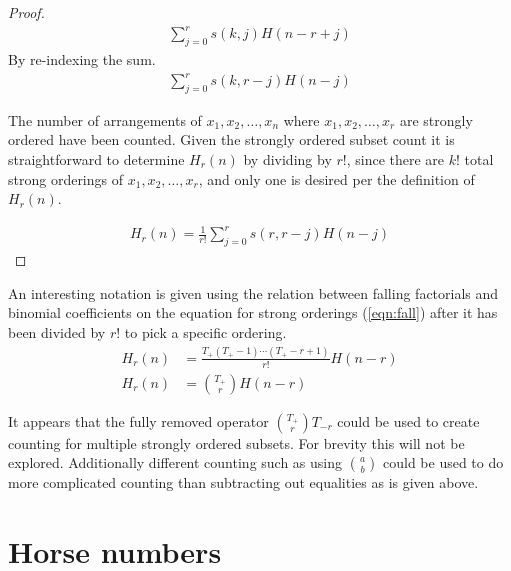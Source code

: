 \documentclass[12pt,reqno]{article}
\begin{document}
\begin{theorem}
\begin{proof}
\begin{align}
	\sum_{j = 0}^{r} s(k,j) H(n - r + j)
\end{align}
By re-indexing the sum.
\begin{align}
	\sum_{j = 0}^{r} s(k,r - j) H(n - j)
\end{align}

The number of arrangements of $x_{1}, x_{2}, \ldots, x_{n}$ where $x_{1}, x_{2}, \ldots, x_{r}$ are strongly ordered have been counted. Given the strongly ordered subset count it is straightforward  to determine $H_{r}(n)$ by dividing by $r!$, since there are $k!$ total strong orderings of $x_{1}, x_{2}, \ldots, x_{r}$, and only one is desired per the definition of $H_{r}(n)$.

\begin{align}
	H_{r} (n) = \frac{1}{r!}\sum_{j = 0}^{r} s(r,r - j) H(n - j) \nonumber
\end{align}



\end{proof}

\end{theorem}


An interesting notation is given using the relation between falling factorials and binomial coefficients on the equation for strong orderings (\ref{eqn:fall}) after it has been divided by $r!$ to pick a specific ordering.
\begin{align}
	H_{r} (n)  &= \frac{T_{+} (T_{+} - 1) \cdots (T_{+} - r + 1)}{r!} H(n - r)\\
	H_{r} (n)  &= \binom{T_{+}}{r} H(n - r) \label{eqn:binom}
\end{align}

It appears that the fully removed operator $\binom{T_{+}}{r} T_{-r}$ could be used to create counting for multiple strongly ordered subsets. For brevity this will not be explored. Additionally different counting such as using $\binom{a}{b}$ could be used to do more complicated counting than subtracting out equalities as is given above.




\section{Horse numbers}
\end{document}
